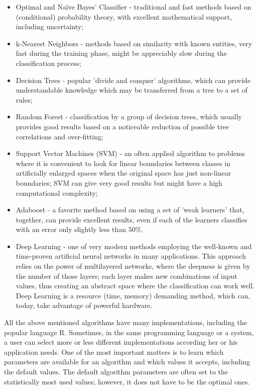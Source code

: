 \documentclass[11pt,openany,executivepaper]{book}
\begin{document}
\begin{itemize}
  \item Optimal and Naïve Bayes' Classifier - traditional and fast methods based on (conditional) probability theory, with excellent mathematical support, including uncertainty;
  \item k-Nearest Neighbors - methods based on similarity with known entities, very fast during the training phase, might be appreciably slow during the classification process;
  \item Decision Trees - popular 'divide and conquer' algorithms, which can provide understandable knowledge which may be transferred from a tree to a set of rules;
  \item Random Forest - classification by a group of decision trees, which usually provides good results based on a noticeable reduction of possible tree correlations and over-fitting;
  \item Support Vector Machines (SVM) - an often applied algorithm to problems where it is convenient to look for linear boundaries between classes in artificially enlarged spaces when the original space has just non-linear boundaries; SVM can give very good results but might have a high computational complexity;
  \item Adaboost - a favorite method based on using a set of 'weak learners' that, together, can provide excellent results, even if each of the learners classifies with an error only slightly less than $50 \%$.
  \item Deep Learning - one of very modern methods employing the well-known and time-proven artificial neural networks in many applications. This approach relies on the power of multilayered networks, where the deepness is given by the number of those layers; each layer makes new combinations of input values, thus creating an abstract space where the classification can work well. Deep Learning is a resource (time, memory) demanding method, which can, today, take advantage of powerful hardware.
\end{itemize}

All the above mentioned algorithms have many implementations, including the popular language R. Sometimes, in the same programming language or a system, a user can select more or less different implementations according her or his application needs. One of the most important matters is to learn which parameters are available for an algorithm and which values it accepts, including the default values. The default algorithm parameters are often set to the statistically most used values; however, it does not have to be the optimal ones.
\end{document}
